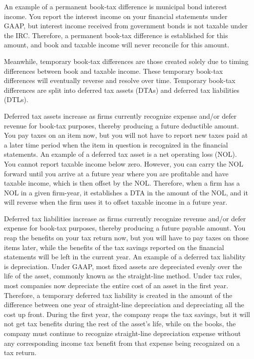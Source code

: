 \documentclass[12pt]{article}
\begin{document}
An example of a permanent book-tax difference is municipal bond interest income. You report the interest income on your financial statements under GAAP, but interest income received from government bonds is not taxable under the IRC. Therefore, a permanent book-tax difference is established for this amount, and book and taxable income will never reconcile for this amount.

Meanwhile, temporary book-tax differences are those created solely due to timing differences between book and taxable income. These temporary book-tax differences will eventually reverse and resolve over time. Temporary book-tax differences are split into deferred tax assets (DTAs) and deferred tax liabilities (DTLs).

Deferred tax assets increase as firms currently recognize expense and/or defer revenue for book-tax purposes, thereby producing a future deductible amount. You pay taxes on an item now, but you will not have to report new taxes paid at a later time period when the item in question is recognized in the financial statements. An example of a deferred tax asset is a net operating loss (NOL). You cannot report taxable income below zero. However, you can carry the NOL forward until you arrive at a future year where you are profitable and have taxable income, which is then offset by the NOL. Therefore, when a firm has a NOL in a given firm-year, it establishes a DTA in the amount of the NOL, and it will reverse when the firm uses it to offset taxable income in a future year.

Deferred tax liabilities increase as firms currently recognize revenue and/or defer expense for book-tax purposes, thereby producing a future payable amount. You reap the benefits on your tax return now, but you will have to pay taxes on those items later, while the benefits of the tax savings reported on the financial statements will be left in the current year. An example of a deferred tax liability is depreciation. Under GAAP, most fixed assets are depreciated evenly over the life of the asset, commonly known as the straight-line method. Under tax rules, most companies now depreciate the entire cost of an asset in the first year. Therefore, a temporary deferred tax liability is created in the amount of the difference between one year of straight-line depreciation and depreciating all the cost up front. During the first year, the company reaps the tax savings, but it will not get tax benefits during the rest of the asset’s life, while on the books, the company must continue to recognize straight-line depreciation expense without any corresponding income tax benefit from that expense being recognized on a tax return.
\end{document}
